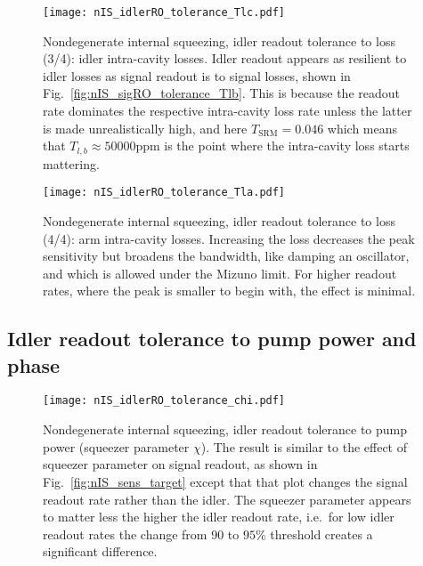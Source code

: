 \begin{figure}
	\centering
	\texttt{[image: nIS\_idlerRO\_tolerance\_Tlc.pdf]}
	\caption{  Nondegenerate internal squeezing, idler readout tolerance to loss (3/4): idler intra-cavity losses. Idler readout appears as resilient to idler losses as signal readout is to signal losses, shown in Fig.~\ref{fig:nIS_sigRO_tolerance_Tlb}. This is because the readout rate dominates the respective intra-cavity loss rate unless the latter is made unrealistically high, and here $T_\text{SRM}=0.046$ which means that $T_{l,b}\approx50000\text{ppm}$ is the point where the intra-cavity loss starts mattering.}
	\label{fig:}
\end{figure}
\begin{figure}
    \centering
    \texttt{[image: nIS\_idlerRO\_tolerance\_Tla.pdf]} 
    \caption{ Nondegenerate internal squeezing, idler readout tolerance to loss (4/4): arm intra-cavity losses. Increasing the loss decreases the peak sensitivity but broadens the bandwidth, like damping an oscillator, and which is allowed under the Mizuno limit. For higher readout rates, where the peak is smaller to begin with, the effect is minimal.}
    \label{fig:}
\end{figure}


\subsection{Idler readout tolerance to pump power and phase}


\begin{figure}
	\centering
	\texttt{[image: nIS\_idlerRO\_tolerance\_chi.pdf]} %
	\caption{ Nondegenerate internal squeezing, idler readout tolerance to pump power (squeezer parameter $\chi$). The result is similar to the effect of squeezer parameter on signal readout, as shown in Fig.~\ref{fig:nIS_sens_target} except that that plot changes the signal readout rate rather than the idler. The squeezer parameter appears to matter less the higher the idler readout rate, i.e.\ for low idler readout rates the change from 90 to $95\%$ threshold creates a significant  difference. }
	\label{fig:}
\end{figure}

